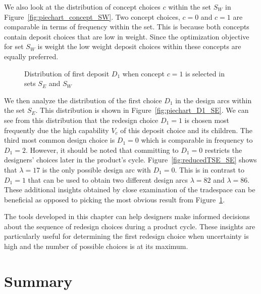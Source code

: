 We also look at the distribution of concept choices $c$ within the set $S_W$ in Figure~\ref{fig:piechart_concept_SW}. Two concept choices, $c=0$ and $c=1$ are comparable in terms of frequency within the set. This is because both concepts contain deposit choices that are low in weight. Since the optimization objective for set $S_W$ is weight the low weight deposit choices within these concepts are equally preferred.

\begin{figure}[h!]
	\centering
	\caption{Distribution of first deposit $D_1$ when concept $c=1$ is selected in sets $S_E$ and $S_W$}
	\label{fig:piechart_D1}
\end{figure}

We then analyze the distribution of the first choice $D_1$ in the design arcs within the set $S_E$. This distribution is shown in Figure~\ref{fig:piechart_D1_SE}. We can see from this distribution that the redesign choice $D_1 = 1$ is chosen most frequently due the high capability $V_c$ of this deposit choice and its children. The third most common design choice is $D_1 = 0$ which is comparable in frequency to $D_1 = 2$. However, it should be noted that committing to $D_1 = 0$ restricts the designers' choices later in the product's cycle. Figure~\ref{fig:reducedTSE_SE} shows that $\lambda = 17$ is the only possible design arc with $D_1 = 0$. This is in contrast to $D_1 = 1$ that can be used to obtain two different design arcs $\lambda = 82$ and $\lambda = 86$. These additional insights obtained by close examination of the tradespace can be beneficial as opposed to picking the most obvious result from Figure~\ref{fig:piechart_D1}.

The tools developed in this chapter can help designers make informed decisions about the sequence of redesign choices during a product cycle. These insights are particularly useful for determining the first redesign choice when uncertainty is high and the number of possible choices is at its maximum.

\section{Summary}
\label{sec:TSEcontsummary}

